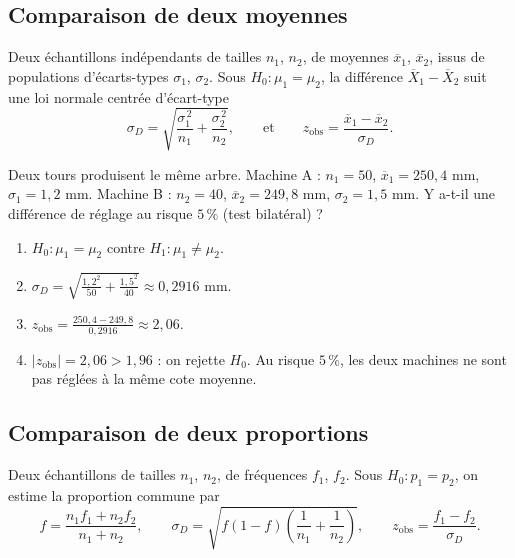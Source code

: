 \documentclass[a4paper,11pt]{article}
\begin{document}
\subsection{Comparaison de deux moyennes}

\begin{theoreme}
Deux échantillons indépendants de tailles $n_1$, $n_2$, de moyennes $\overline{x}_1$, $\overline{x}_2$, issus de populations d'écarts-types $\sigma_1$, $\sigma_2$. Sous $H_0 : \mu_1 = \mu_2$, la différence $\overline{X}_1 - \overline{X}_2$ suit une loi normale centrée d'écart-type
\[
\sigma_D = \sqrt{\frac{\sigma_1^{\,2}}{n_1} + \frac{\sigma_2^{\,2}}{n_2}}, \qquad\text{et}\qquad
z_{\text{obs}} = \frac{\overline{x}_1 - \overline{x}_2}{\sigma_D}.
\]
\end{theoreme}

\begin{exemple}
Deux tours produisent le même arbre. Machine A : $n_1 = 50$, $\overline{x}_1 = 250{,}4$ mm, $\sigma_1 = 1{,}2$ mm. Machine B : $n_2 = 40$, $\overline{x}_2 = 249{,}8$ mm, $\sigma_2 = 1{,}5$ mm. Y a-t-il une différence de réglage au risque $5\,\%$ (test bilatéral) ?
\begin{enumerate}
  \item $H_0 : \mu_1 = \mu_2$ contre $H_1 : \mu_1 \neq \mu_2$.
  \item $\sigma_D = \sqrt{\frac{1{,}2^2}{50} + \frac{1{,}5^2}{40}} \approx 0{,}2916$ mm.
  \item $z_{\text{obs}} = \frac{250{,}4 - 249{,}8}{0{,}2916} \approx 2{,}06$.
  \item $|z_{\text{obs}}| = 2{,}06 > 1{,}96$ : on rejette $H_0$. Au risque $5\,\%$, les deux machines ne sont pas réglées à la même cote moyenne.
\end{enumerate}
\end{exemple}

\subsection{Comparaison de deux proportions}

\begin{theoreme}
Deux échantillons de tailles $n_1$, $n_2$, de fréquences $f_1$, $f_2$. Sous $H_0 : p_1 = p_2$, on estime la proportion commune par
\[
f = \frac{n_1 f_1 + n_2 f_2}{n_1 + n_2}, \qquad
\sigma_D = \sqrt{f(1-f)\left(\frac{1}{n_1} + \frac{1}{n_2}\right)}, \qquad
z_{\text{obs}} = \frac{f_1 - f_2}{\sigma_D}.
\]
\end{theoreme}
\end{document}
